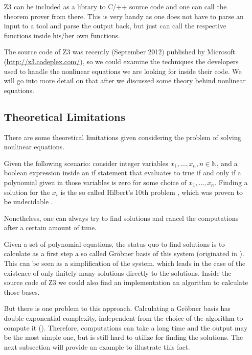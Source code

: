 \documentclass[oribibl]{llncs}
\newcommand{\NN}{{\mathbb{N}}}
\begin{document}
\textsc{Z3} can be included as a library to C/++ source code and one
can call the theorem prover from there. This is very handy as one does
not have to parse an input to a tool and parse the output back, but
just can call the respective functions inside his/her own functions.

The source code of \textsc{Z3} was recently (September 2012) published
by Microsoft (\url{http://z3.codeplex.com/}), so we could examine the
techniques the developers used to handle the nonlinear equations we
are looking for inside their code. We will go into more detail on that
after we discussed some theory behind nonlinear equations.

\subsection{Theoretical Limitations}

There are some theoretical limitations given considering the problem
of solving nonlinear equations.

Given the following scenario: consider integer variables $x_1, \ldots,
x_n, n \in \NN$, and a boolean expression inside an if statement that
evaluates to true if and only if a polynomial given in those variables
is zero for some choice of $x_1, \ldots, x_n$. Finding a solution for
the $x_i$ is the so called Hilbert's 10th problem
\cite{davis1984hilbert}, which was proven to be undecidable
\cite{matiyasevich1970enumerable}.

Nonetheless, one can always try to find solutions and cancel the
computations after a certain amount of time.

Given a set of polynomial equations, the status quo to find solutions
is to calculate as a first step a so called Gr\"obner basis of this system (originated
in \cite{buchberger1970algorithmisches}). This can be seen as a
simplification of the system, which leads in the case of the existence
of only finitely many solutions directly to the solutions. Inside the
source code of \textsc{Z3} we could also find an implementation an
algorithm to calculate those bases.

But there is one problem to this approach. Calculating a Gr\"obner
basis has double exponential complexity, independent from the choice
of the algorithm to compute it (\cite{mayr1982complexity}). Therefore,
computations can take a long time and the output may be the most
simple one, but is still hard to utilize for finding the
solutions. The next subsection will provide an example to illustrate
this fact.
\end{document}
